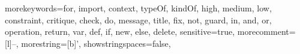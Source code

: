 {morekeywords={for, import, context, typeOf, kindOf, high, medium, low, constraint, critique, check, do, message, title, fix, not, guard, in, and, or, operation, return, var, def, if, new, else, delete},
sensitive=true,
morecomment=[l]{--},
morestring=[b]',
showstringspaces=false,
}
